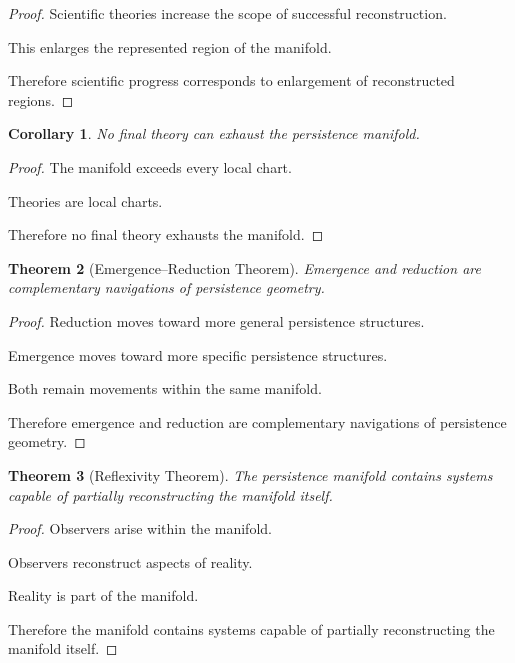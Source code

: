 \documentclass[12pt,oneside]{article}
\newtheorem{theorem}{Theorem}[section] \newtheorem{lemma}[theorem]{Lemma} \newtheorem{proposition}[theorem]{Proposition} \newtheorem{corollary}[theorem]{Corollary}
\theoremstyle{definition}
\begin{document}
\begin{proof}

Scientific theories increase the scope of successful reconstruction.

This enlarges the represented region of the manifold.

Therefore scientific progress corresponds to enlargement of reconstructed regions.

\end{proof}

\begin{corollary}

No final theory can exhaust the persistence manifold.

\end{corollary}

\begin{proof}

The manifold exceeds every local chart.

Theories are local charts.

Therefore no final theory exhausts the manifold.

\end{proof}

\begin{theorem}[Emergence--Reduction Theorem]

Emergence and reduction are complementary navigations of persistence geometry.

\end{theorem}

\begin{proof}

Reduction moves toward more general persistence structures.

Emergence moves toward more specific persistence structures.

Both remain movements within the same manifold.

Therefore emergence and reduction are complementary navigations of persistence geometry.

\end{proof}

\begin{theorem}[Reflexivity Theorem]

The persistence manifold contains systems capable of partially reconstructing the manifold itself.

\end{theorem}

\begin{proof}

Observers arise within the manifold.

Observers reconstruct aspects of reality.

Reality is part of the manifold.

Therefore the manifold contains systems capable of partially reconstructing the manifold itself.

\end{proof}
\end{document}
